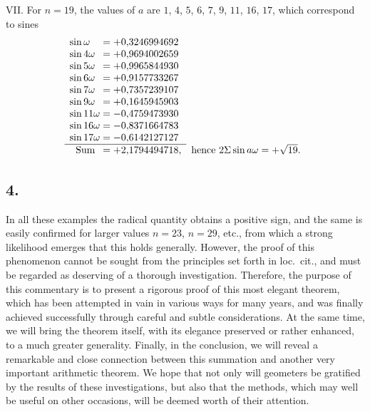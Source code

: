\documentclass[twoside,12pt]{memoir}
\begin{document}
VII. For \(n=19\), the values of \(a\) are \(1\), \(4\), \(5\), \(6\), \(7\), \(9\), \(11\), \(16\), \(17\), which correspond to sines
\[\begin{array}{rl}
 \sin \omega\phantom{11}=+0{,}3246994692 \phantom{,}&\\
 \sin 4 \omega\phantom{1}=+0{,}9694002659 \phantom{,}&\\
 \sin 5 \omega\phantom{1}=+0{,}9965844930 \phantom{,}&\\
\sin 6 \omega\phantom{1}=+0{,}9157733267 \phantom{,}&\\
 \sin 7 \omega\phantom{1}=+0{,}7357239107 \phantom{,}&\\
 \sin 9 \omega\phantom{1}=+0{,}1645945903 \phantom{,}&\\
 \sin 11 \omega=-0{,}4759473930 \phantom{,}&\\
 \sin 16 \omega=-0{,}8371664783 \phantom{,}&\\
 \sin 17 \omega=-0{,}6142127127 \phantom{,}&\\ 
 \cline{1-1} \text{Sum\phantom{a}}=+2{,}1794494718,&\text{hence } 2 \Sigma \sin a \omega=+\sqrt{19}.
\end{array}\]\pagebreak%

\subsection*{4.}

In all these examples the radical quantity obtains a positive sign, and the same is easily confirmed for larger values \(n=23\), \(n=29\), etc{.}, from which a strong likelihood emerges that this holds generally. However, the proof of this phenomenon cannot be sought from the principles set forth in {loc.\ cit.}, and must be regarded as deserving of a thorough investigation. Therefore, the purpose of this commentary is to present a rigorous proof of this most elegant theorem, which has been attempted in vain in various ways for many years, and was finally achieved successfully through careful and subtle considerations. At the same time, we will bring the theorem itself, with its elegance preserved or rather enhanced, to a much greater generality. Finally, in the conclusion, we will reveal a remarkable and close connection between this summation and another very important arithmetic theorem. We hope that not only will geometers be gratified by the results of these investigations, but also that the methods, which may well be useful on other occasions, will be deemed worth of their attention.
\end{document}

